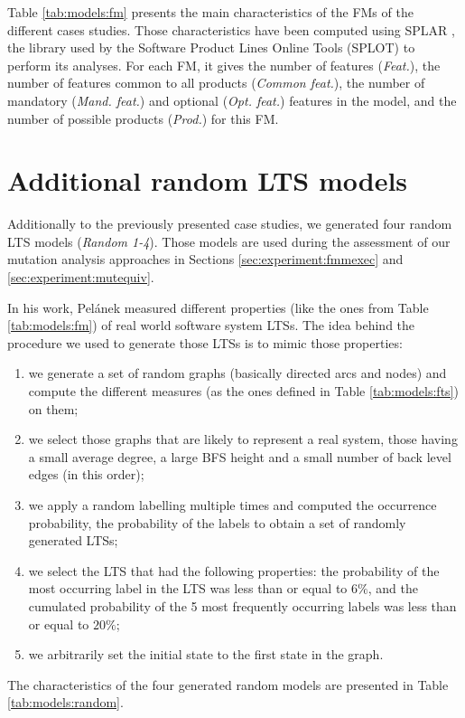 Table \ref{tab:models:fm} presents the main characteristics of the \glspl{FM} of the different cases studies. Those characteristics have been computed using SPLAR \cite{Mendonca2010}, the library used by the Software Product Lines Online Tools (SPLOT) \cite{Mendonca2009} to perform its analyses. For each FM, it gives the number of features (\emph{Feat.}), the number of features common to all products (\emph{Common feat.}), the number of mandatory (\emph{Mand. feat.}) and optional (\emph{Opt. feat.}) features in the model, and the number of possible products (\emph{Prod.}) for this FM.


\section{Additional random LTS models}

\label{sec:casestudy:random}

Additionally to the previously presented case studies, we generated four random LTS models (\textit{Random 1-4}). Those models are used during the assessment of our mutation analysis approaches in Sections \ref{sec:experiment:fmmexec} and \ref{sec:experiment:mutequiv}. 

In his work, Pel\'anek \cite{Pelanek2008a,Pelanek2004a,Pelanek2008} measured different properties (like the ones from Table \ref{tab:models:fm}) of real world software system LTSs. The idea behind the procedure we used to generate those LTSs is to mimic those properties:
%
\begin{enumerate}
\item we generate a set of random graphs (basically directed arcs and nodes) and compute the different measures (as the ones defined in Table \ref{tab:models:fts}) on them;
\item we select those graphs that are likely to represent a real system, \ie those having a small average degree, a large BFS height and a small number of back level edges (in this order);
\item we apply a random labelling multiple times and computed the occurrence probability, \ie the probability of the labels to obtain a set of randomly generated LTSs;
\item we select the LTS that had the following properties: the probability of the most occurring label in the LTS was less than or equal to $6\%$, and the cumulated probability of the 5 most frequently occurring labels was less than or equal to $20\%$;
\item we arbitrarily set the initial state to the first state in the graph.
\end{enumerate}
%
The characteristics of the four generated random models are presented in Table \ref{tab:models:random}.

